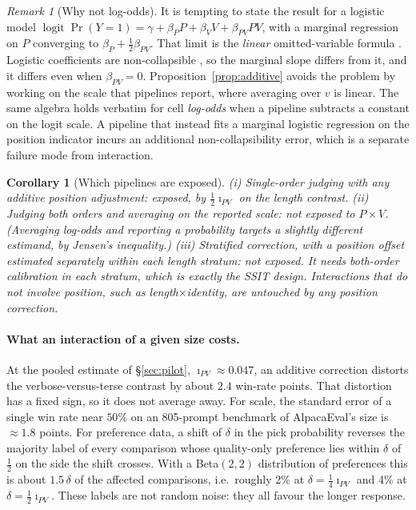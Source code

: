 \documentclass[10pt]{article}
\newtheorem{corollary}{Corollary}
\theoremstyle{remark}
\newtheorem{remark}{Remark}
\newcommand{\iPV}{\imath_{PV}}
\newcommand{\logit}{\operatorname{logit}}
\begin{document}
\begin{remark}[Why not log-odds]
\label{rem:logodds}
It is tempting to state the result for a logistic model
$\logit\Pr(Y{=}1)=\gamma+\beta_P P+\beta_V V+\beta_{PV}PV$, with a
marginal regression on $P$ converging to $\beta_P+\tfrac12\beta_{PV}$.
That limit is the \emph{linear} omitted-variable formula
\citep{angrist2009}. Logistic coefficients are non-collapsible
\citep{greenland1999collapsibility}, so the marginal slope differs from
it, and it differs even when $\beta_{PV}=0$. Proposition~\ref{prop:additive}
avoids the problem by working on the scale that pipelines report, where
averaging over $v$ is linear. The same algebra holds verbatim for cell
\emph{log-odds} when a pipeline subtracts a constant on the logit
scale. A pipeline that instead fits a marginal logistic regression on
the position indicator incurs an additional non-collapsibility error,
which is a separate failure mode from interaction.
\end{remark}

\begin{corollary}[Which pipelines are exposed]
\label{cor:exposure}
(i) Single-order judging with any additive position adjustment: exposed,
by $\tfrac12\iPV$ on the length contrast.
(ii) Judging both orders and averaging on the reported scale: not exposed
to $P{\times}V$. (Averaging log-odds and reporting a probability targets
a slightly different estimand, by Jensen's inequality.)
(iii) Stratified correction, with a position offset estimated
separately within each length stratum: not exposed. It needs both-order
calibration in each stratum, which is exactly the SSIT design.
Interactions that do not involve position, such as length$\times$identity,
are untouched by any position correction.
\end{corollary}

\paragraph{What an interaction of a given size costs.}
At the pooled estimate of \S\ref{sec:pilot}, $\iPV\approx0.047$, an
additive correction distorts the verbose-versus-terse contrast by about
$2.4$ win-rate points. That distortion has a fixed sign, so it does not
average away. For scale, the standard error of a single win rate near
$50\%$ on an 805-prompt benchmark of AlpacaEval's size is
$\approx1.8$ points. For preference data, a shift of $\delta$ in the
pick probability reverses the majority label of every comparison whose
quality-only preference lies within $\delta$ of $\tfrac12$ on the side
the shift crosses. With a Beta$(2,2)$ distribution of preferences this
is about $1.5\,\delta$ of the affected comparisons, i.e.\ roughly 2\%
at $\delta=\tfrac14\iPV$ and 4\% at $\delta=\tfrac12\iPV$. These labels
are not random noise: they all favour the longer response.
\end{document}
